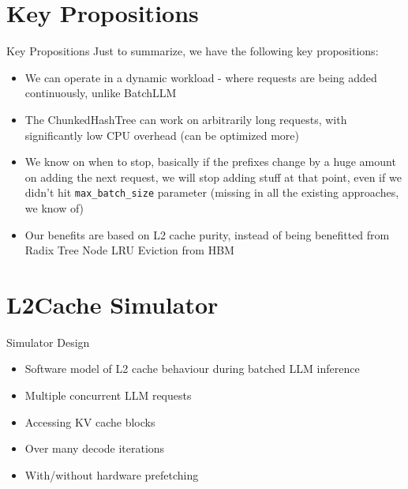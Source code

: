 \documentclass[Serif, 10pt, brown]{beamer}
\theoremstyle{example}
\theoremstyle{plain}
\begin{document}
\section{Key Propositions}
\begin{frame}{Key Propositions}
    Just to summarize, we have the following key propositions:
    \begin{itemize}
        \item We can operate in a dynamic workload - where requests are being added continuously, unlike BatchLLM
        \item The ChunkedHashTree can work on arbitrarily long requests, with significantly low CPU overhead (can be optimized more)
        \item We know on when to stop, basically if the prefixes change by a huge amount on adding the next request, we will stop adding stuff at that point, even if we didn't hit \texttt{max\_batch\_size} parameter (missing in all the existing approaches, we know of)
        \item Our benefits are based on L2 cache purity, instead of being benefitted from Radix Tree Node LRU Eviction from HBM
    \end{itemize}
\end{frame}


\section{L2Cache Simulator}
\begin{frame}{Simulator Design}
    \begin{itemize}
        \item Software model of L2 cache behaviour during batched LLM inference
        \item Multiple concurrent LLM requests
        \item Accessing KV cache blocks
        \item Over many decode iterations
        \item With/without hardware prefetching
    \end{itemize}
\end{frame}
\end{document}
